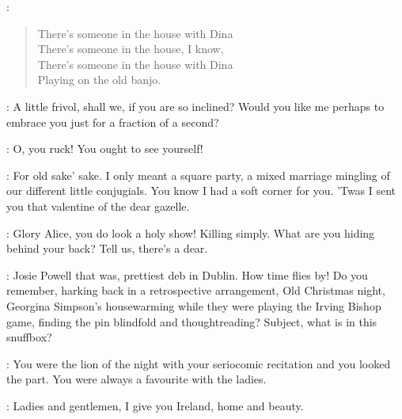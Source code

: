 
\Bohees:
\begin{verse}
%
    There's someone in the house with Dina\\
    There's someone in the house, I know,\\
    There's someone in the house with Dina\\
    Playing on the old banjo.
\end{verse}


\Bloom:
A little frivol, shall we, if you are so inclined?
Would you like me perhaps to embrace you
just for a fraction of a second?

\MrsBreen:
O, you ruck! You ought to see yourself!

\Bloom:
For old sake' sake.
I only meant a square party, a mixed marriage
mingling of our different little conjugials.
You know I had a soft corner for you.
'Twas I sent you that valentine of the dear gazelle.

\MrsBreen:
Glory Alice, you do look a holy show! Killing simply.
What are you hiding behind your back?
Tell us, there's a dear.

\Bloom:
Josie Powell that was, prettiest deb in Dublin.
How time flies by! Do you remember, harking back
in a retrospective arrangement, Old Christmas night,
Georgina Simpson's housewarming while they were playing the Irving Bishop game,
finding the pin blindfold and thoughtreading?
Subject, what is in this snuffbox?

\MrsBreen:
You were the lion of the night
with your seriocomic recitation and you looked the part.
You were always a favourite with the ladies.

\Bloom:
Ladies and gentlemen, I give you Ireland, home and beauty.

